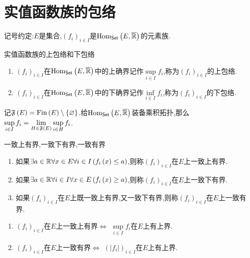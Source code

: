 \section{实值函数族的包络}

记号约定:$E$是集合,$\left(f_{i}\right)_{i\in I}$是$\operatorname{Hom}_{\mathsf{Set}}\left(E,\overline{\mathbb{R}}\right)$的元素族.

\begin{definition}{实值函数族的上包络和下包络}{}
	\begin{enumerate}
		\item $\left(f_{i}\right)_{i\in I}$在$\operatorname{Hom}_{\mathsf{Set}}\left(E,\overline{\mathbb{R}}\right)$中的上确界记作$\sup\limits_{i\in I}f_{i}$,称为$\left(f_{i}\right)_{i\in I}$的上包络.
		\item $\left(f_{i}\right)_{i\in I}$在$\operatorname{Hom}_{\mathsf{Set}}\left(E,\overline{\mathbb{R}}\right)$中的下确界记作$\inf\limits_{i\in I}f_{i}$,称为$\left(f_{i}\right)_{i\in I}$的下包络.
	\end{enumerate}
\end{definition}

\begin{proposition}{}{}
	记$\mathfrak{F}\left(E\right)=\operatorname{Fin}\left(E\right)\setminus\left\{\varnothing\right\}$.给$\operatorname{Hom}_{\mathsf{Set}}\left(E,\overline{\mathbb{R}}\right)$装备乘积拓扑,那么$\sup\limits_{i\in I}f_{i}=\displaystyle\lim_{H\in\mathfrak{F}\left(E\right)}\sup\limits_{i\in H}f_{i}$.
\end{proposition}

\begin{definition}{一致上有界,一致下有界,一致有界}{}
	\begin{enumerate}
		\item 如果$\exists a\in\mathbb{R}\forall x\in E\forall i\in I\left(f_{i}\left(x\right)\leq a\right)$,则称$\left(f_{i}\right)_{i\in I}$在$E$上一致上有界.
		\item 如果$\exists a\in\mathbb{R}\forall i\in I\forall x\in E\left(f_{i}\left(x\right)\geq a\right)$,则称$\left(f_{i}\right)_{i\in I}$在$E$上一致下有界.
		\item 如果$\left(f_{i}\right)_{i\in I}$在$E$上既一致上有界,又一致下有界,则称$\left(f_{i}\right)_{i\in I}$在$E$上一致有界.
	\end{enumerate}
\end{definition}

\begin{remark}{}{}
	\begin{enumerate}
		\item $\left(f_{i}\right)_{i\in I}$在$E$上一致上有界$\iff$ $\sup\limits_{i\in I}f_{i}$在$E$上有上界.
		\item $\left(f_{i}\right)_{i\in I}$在$E$上一致有界$\iff$ $\left(\left|f_{i}\right|\right)_{i\in I}$在$E$上有上界.
	\end{enumerate}
\end{remark}